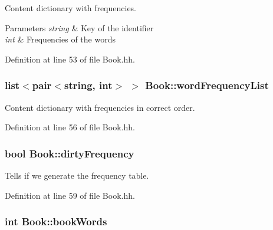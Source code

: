 Content dictionary with frequencies. 


\begin{DoxyParams}{Parameters}
{\em string} & Key of the identifier \\
\hline
{\em int} & Frequencies of the words \\
\hline
\end{DoxyParams}


Definition at line 53 of file Book.\+hh.

\subsubsection[{\texorpdfstring{word\+Frequency\+List}{wordFrequencyList}}]{\setlength{\rightskip}{0pt plus 5cm}list$<$pair$<$string, int$>$ $>$ Book\+::word\+Frequency\+List\hspace{0.3cm}{\ttfamily [private]}}\hypertarget{class_book_aa9035db1c21cf61eb3af84ad69829069}{}\label{class_book_aa9035db1c21cf61eb3af84ad69829069}


Content dictionary with frequencies in correct order. 



Definition at line 56 of file Book.\+hh.

\subsubsection[{\texorpdfstring{dirty\+Frequency}{dirtyFrequency}}]{\setlength{\rightskip}{0pt plus 5cm}bool Book\+::dirty\+Frequency\hspace{0.3cm}{\ttfamily [private]}}\hypertarget{class_book_ad1df1050750f0605efdfab51b86c0765}{}\label{class_book_ad1df1050750f0605efdfab51b86c0765}


Tells if we generate the frequency table. 



Definition at line 59 of file Book.\+hh.

\subsubsection[{\texorpdfstring{book\+Words}{bookWords}}]{\setlength{\rightskip}{0pt plus 5cm}int Book\+::book\+Words\hspace{0.3cm}{\ttfamily [private]}}\hypertarget{class_book_a36f1e0b30a0ad17606976556cab45a23}{}\label{class_book_a36f1e0b30a0ad17606976556cab45a23}


